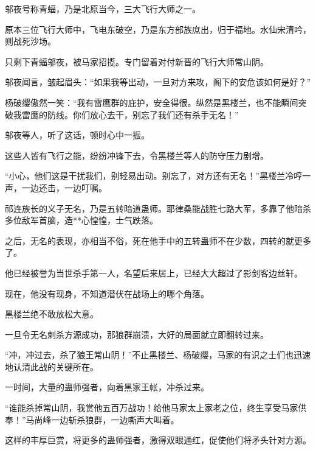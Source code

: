 \begin{this_body}
邬夜号称青蝠，乃是北原当今，三大飞行大师之一。

原本三位飞行大师中，飞电东破空，乃是东方部族庶出，归于福地。水仙宋清吟，则战死沙场。

只剩下青蝠邬夜，被马家招揽。专门留着对付新晋的飞行大师常山阴。

邬夜闻言，皱起眉头：“如果我等出动，一旦对方来攻，阁下的安危该如何是好？”

杨破缨傲然一笑：“我有雷鹰群的庇护，安全得很。纵然是黑楼兰，也不能瞬间突破我雷鹰的防线。你们放心去干，别忘了我们还有杀手无名！”

邬夜等人，听了这话，顿时心中一振。

这些人皆有飞行之能，纷纷冲锋下去，令黑楼兰等人的防守压力剧增。

“小心，他们这是干扰我们，别轻易出动。别忘了，对方还有无名！”黑楼兰冷哼一声，一边还击，一边叮嘱。

祁连族长的义子无名，乃是五转暗道蛊师。耶律桑能战胜七路大军，多靠了他暗杀多位敌军首脑，造**心惶惶，士气跌落。

之后，无名的表现，亦相当不俗，死在他手中的五转蛊师不在少数，四转的就更多了。

他已经被誉为当世杀手第一人，名望后来居上，已经大大超过了影剑客边丝轩。

现在，他没有现身，不知道潜伏在战场上的哪个角落。

黑楼兰绝不敢放松大意。

一旦令无名刺杀方源成功，那狼群崩溃，大好的局面就立即翻转过来。

“冲，冲过去，杀了狼王常山阴！”不止黑楼兰、杨破缨，马家的有识之士们也迅速地认清此战的关键所在。

一时间，大量的蛊师强者，向着黑家王帐，冲杀过来。

“谁能杀掉常山阴，我赏他五百万战功！给他马家太上家老之位，终生享受马家供奉！”马尚峰一边斩杀狼群，一边嘶声大叫着。

这样的丰厚巨赏，将更多的蛊师强者，激得双眼通红，促使他们将矛头针对方源。

\end{this_body}

